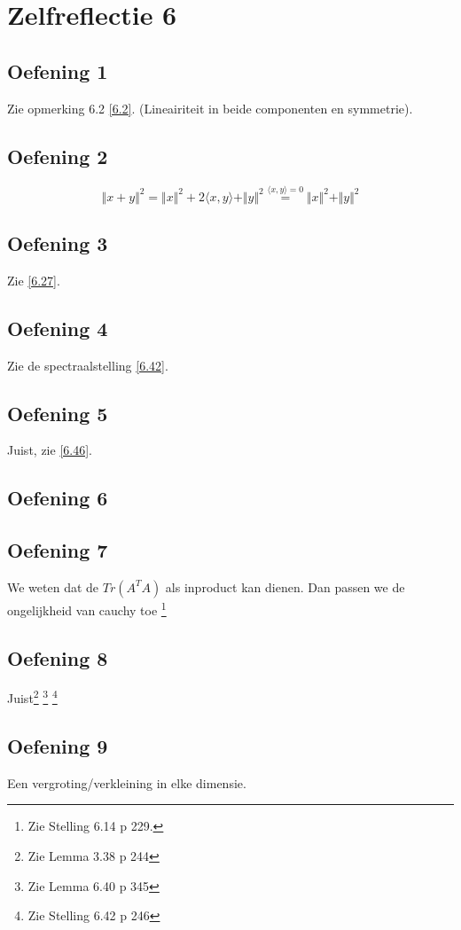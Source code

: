 \documentclass[lineaire_algebra_oplossingen.tex]{subfiles}
\begin{document}
\section{Zelfreflectie 6}
\subsection{Oefening 1}
Zie opmerking 6.2 \ref{6.2}. (Lineairiteit in beide componenten en symmetrie).

\subsection{Oefening 2}
\[
\Vert x+y \Vert^2 = \Vert x\Vert^2 + 2\langle x,y \rangle+ \Vert y\Vert^2 \overset{\langle x,y \rangle = 0}{=}\Vert x\Vert^2 + \Vert y\Vert^2
\]

\subsection{Oefening 3}
Zie \ref{6.27}.

\subsection{Oefening 4}
Zie de spectraalstelling \ref{6.42}.

\subsection{Oefening 5}
Juist, zie \ref{6.46}.

\subsection{Oefening 6}

\subsection{Oefening 7}
We weten dat de $Tr(A^T A)$ als inproduct kan dienen. Dan passen we de ongelijkheid van cauchy toe \footnote{Zie Stelling 6.14 p 229.}

\subsection{Oefening 8}
Juist\footnote{Zie Lemma 3.38 p 244} \footnote{Zie Lemma 6.40 p 345} \footnote{Zie Stelling 6.42 p 246}

\subsection{Oefening 9}
Een vergroting/verkleining in elke dimensie.
\end{document}
